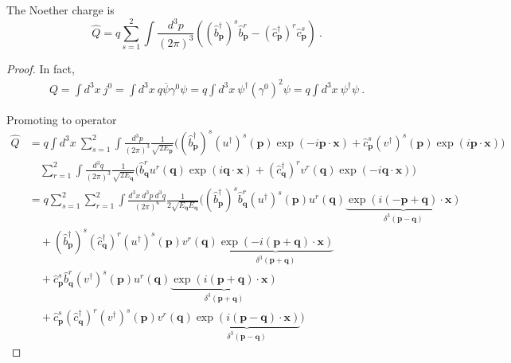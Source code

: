     The Noether charge is 
    \begin{equation*}
        \hat Q = q \sum_{s=1}^{2} \int \frac{d^3 p}{(2\pi)^3} ((\hat b^\dagger_{\mathbf p})^s \hat b^r_{\mathbf p} - (\hat c_{\mathbf p}^\dagger)^r \hat c^s_{\mathbf p}) ~.
    \end{equation*}
    \begin{proof}
        In fact, 
        \begin{equation*}
        \begin{aligned}
            Q = \int d^3 x ~ j^0 = \int d^3 x ~ q \overline \psi \gamma^0 \psi = q \int d^3 x ~  \psi^\dagger (\gamma^0)^2 \psi = q \int d^3 x ~ \psi^\dagger \psi ~.
        \end{aligned}
        \end{equation*}

        Promoting to operator 
        \begin{equation*}
        \begin{aligned}
            \hat Q & = q \int d^3 x ~ \sum_{s=1}^{2} \int \frac{d^3 p}{(2\pi)^3} \frac{1}{\sqrt{2 E_{\mathbf p}}} \Big ( (\hat b^\dagger_{\mathbf p})^s (u^\dagger)^s (\mathbf p) \exp(- i \mathbf p \cdot \mathbf x) + \hat c^s_{\mathbf p} (v^\dagger)^s(\mathbf p) \exp(i \mathbf p \cdot \mathbf x) \Big) \\ & \quad \sum_{r=1}^{2} \int \frac{d^3 q}{(2\pi)^3} \frac{1}{\sqrt{2 E_{\mathbf q}}} \Big ( \hat b^r_{\mathbf q} u^r (\mathbf q) \exp(i \mathbf q \cdot \mathbf x) + (\hat c_{\mathbf q}^\dagger)^r v^r(\mathbf q) \exp(- i \mathbf q \cdot \mathbf x) \Big) \\ & = q \sum_{s=1}^{2} \sum_{r=1}^{2} \int \frac{d^3 x ~ d^3 p ~ d^3 q}{(2\pi)^6} \frac{1}{2 \sqrt{E_{\mathbf q} E_{\mathbf q}}}  \Big ( (\hat b^\dagger_{\mathbf p})^s \hat b^r_{\mathbf q}  (u^\dagger)^s (\mathbf p) u^r (\mathbf q) \underbrace{\exp(i (- \mathbf p + \mathbf q) \cdot \mathbf x)}_{\delta^3 (\mathbf p - \mathbf q)} \\ & \quad + (\hat b^\dagger_{\mathbf p})^s (\hat c_{\mathbf q}^\dagger)^r (u^\dagger)^s (\mathbf p) v^r(\mathbf q) \underbrace{\exp( -i (\mathbf p + \mathbf q) \cdot \mathbf x)}_{\delta^3 (\mathbf p + \mathbf q)} \\ & \quad + \hat c^s_{\mathbf p} \hat b^r_{\mathbf q} (v^\dagger)^s (\mathbf p) u^r (\mathbf q) \underbrace{\exp(i (\mathbf p + \mathbf q) \cdot \mathbf x)}_{\delta^3 (\mathbf p + \mathbf q)} \\ & \quad + \hat c^s_{\mathbf p} (\hat c_{\mathbf q}^\dagger)^r (v^\dagger)^s(\mathbf p) v^r(\mathbf q) \underbrace{\exp(i (\mathbf p - \mathbf q) \cdot \mathbf x)}_{\delta^3 (\mathbf p - \mathbf q)} \Big )

\end{aligned}
\end{equation*}
\end{proof}
